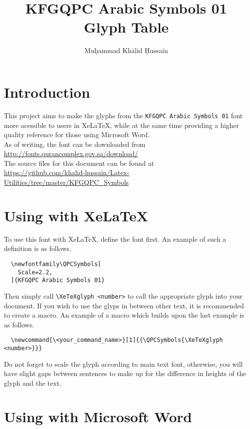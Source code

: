 \documentclass{scrartcl}
\author{Muḥammad Khālid Ḥussain}
\title{KFGQPC Arabic Symbols 01 Glyph Table}
\date{\Hijritoday[1]}
\begin{document}
\maketitle

\section{Introduction}

This project aims to make the glyphs from the \verb$KFGQPC Arabic Symbols 01$ font more acessible to users in XeLaTeX, while at the same time providing a higher quality reference for those using Microsoft Word.\\

As of writing, the font can be downloaded from\\
\url{http://fonts.qurancomplex.gov.sa/download/}\\

The source files for this document can be found at\\
\url{https://github.com/khalid-hussain/Latex-Utilities/tree/master/KFGQPC_Symbols}

\section{Using with XeLaTeX{}}

To use this font with XeLaTeX, define the font first. An example of such a definition is as follows.

  \begin{verbatim}
  \newfontfamily\QPCSymbols[
    Scale=2.2,
  ]{KFGQPC Arabic Symbols 01}
  \end{verbatim}

Then simply call \verb$\XeTeXglyph <number>$ to call the appropriate glyph into your document. If you wish to use the glyps in between other text, it is recommended to create a macro. An example of a macro which builds upon the last example is as follows.

  \begin{verbatim}
  \newcommand{\<your_command_name>}[1]{{\QPCSymbols{\XeTeXglyph <number>}}}
  \end{verbatim}

Do not forget to scale the glyph according to main text font, otherwise, you will have slight gaps between sentences to make up for the difference in heights of the glyph and the text.

\section{Using with Microsoft Word}
\end{document}
